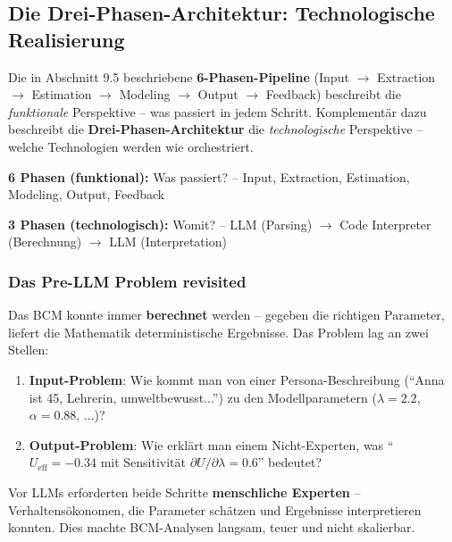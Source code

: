 \subsection{Die Drei-Phasen-Architektur: Technologische Realisierung}

Die in Abschnitt 9.5 beschriebene \textbf{6-Phasen-Pipeline} (Input $\rightarrow$ Extraction $\rightarrow$ Estimation $\rightarrow$ Modeling $\rightarrow$ Output $\rightarrow$ Feedback) beschreibt die \textit{funktionale} Perspektive -- was passiert in jedem Schritt.
Komplementär dazu beschreibt die \textbf{Drei-Phasen-Architektur} die \textit{technologische} Perspektive -- welche Technologien werden wie orchestriert.

\begin{tcolorbox}[colback=blue!5!white, colframe=blue!75!black, title=Zwei komplementäre Perspektiven]
\textbf{6 Phasen (funktional):} Was passiert? -- Input, Extraction, Estimation, Modeling, Output, Feedback

\textbf{3 Phasen (technologisch):} Womit? -- LLM (Parsing) $\rightarrow$ Code Interpreter (Berechnung) $\rightarrow$ LLM (Interpretation)
\end{tcolorbox}

\subsubsection{Das Pre-LLM Problem revisited}

Das BCM konnte immer \textbf{berechnet} werden -- gegeben die richtigen Parameter, liefert die Mathematik deterministische Ergebnisse.
Das Problem lag an zwei Stellen:

\begin{enumerate}
    \item \textbf{Input-Problem}: Wie kommt man von einer Persona-Beschreibung (``Anna ist 45, Lehrerin, umweltbewusst...'') zu den Modellparametern ($\lambda = 2.2$, $\alpha = 0.88$, ...)?

    \item \textbf{Output-Problem}: Wie erklärt man einem Nicht-Experten, was ``$U_{\text{eff}} = -0.34$ mit Sensitivität $\partial U / \partial \lambda = 0.6$'' bedeutet?
\end{enumerate}

Vor LLMs erforderten beide Schritte \textbf{menschliche Experten} -- Verhaltensökonomen, die Parameter schätzen und Ergebnisse interpretieren konnten.
Dies machte BCM-Analysen langsam, teuer und nicht skalierbar.

